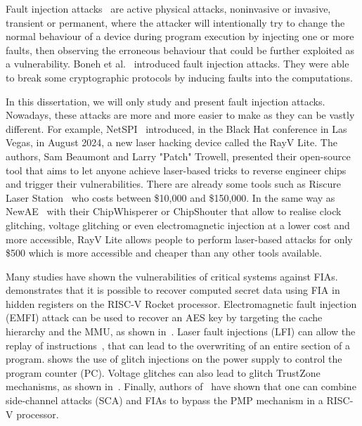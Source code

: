 Fault injection attacks~\cite{BCNTW-06-procieee, BBKN-12-procieee, YSW-18-hss} are active physical attacks, noninvasive or invasive, transient or permanent, where the attacker will intentionally try to change the normal behaviour of a device during program execution by injecting one or more faults, then observing the erroneous behaviour that could be further exploited as a vulnerability. Boneh et al.~\cite{BDL-97-eurocrypt} introduced fault injection attacks. They were able to break some cryptographic protocols by inducing faults into the computations.

In this dissertation, we will only study and present fault injection attacks. Nowadays, these attacks are more and more easier to make as they can be vastly different. For example, NetSPI~\cite{rayvlite_wired} introduced, in the Black Hat conference in Las Vegas, in August 2024, a new laser hacking device called the RayV Lite. The authors, Sam Beaumont and Larry "Patch" Trowell, presented their open-source tool that aims to let anyone achieve laser-based tricks to reverse engineer chips and trigger their vulnerabilities. There are already some tools such as Riscure Laser Station~\cite{riscure_station} who costs between \$10,000 and \$150,000. In the same way as NewAE~\cite{chipwhisperer} with their ChipWhisperer or ChipShouter that allow to realise clock glitching, voltage glitching or even electromagnetic injection at a lower cost and more accessible, RayV Lite allows people to perform laser-based attacks for only \$500 which is more accessible and cheaper than any other tools available.

Many studies have shown the vulnerabilities of critical systems against FIAs.
\cite{LBDP-19-date} demonstrates that it is possible to recover computed secret data using FIA in hidden registers on the RISC-V Rocket processor. 
Electromagnetic fault injection (EMFI) attack can be used to recover an AES key by targeting the cache hierarchy and the MMU, as shown in~\cite{TBELB-21-jce}.
Laser fault injections (LFI) can allow the replay of instructions~\cite{KDD-21-dsd}, that can lead to the overwriting of an entire section of a program.
\cite{TSW-16-fdtc} shows the use of glitch injections on the power supply to control the program counter (PC). Voltage glitches can also lead to glitch TrustZone mechanisms, as shown in~\cite{SMS-23-usenix}.
Finally, authors of~\cite{NSUH-21-tches} have shown that one can combine side-channel attacks (SCA) and FIAs to bypass the PMP mechanism in a RISC-V processor.

